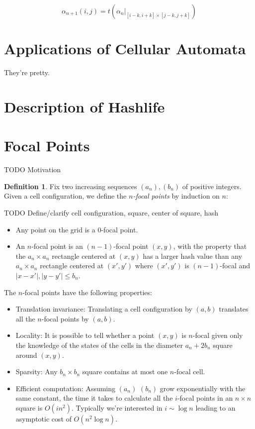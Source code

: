 \documentclass{article}
\theoremstyle{definition}
\newtheorem{definition}{Definition}
\begin{document}
$$ \alpha _{n+1} (i, j) = t (\alpha_n |_{[i-k, i+k] \times [j-k, j+k]}) $$

\section{Applications of Cellular Automata}

They're pretty.

\section{Description of Hashlife}

\section{Focal Points}

TODO Motivation

\begin{definition}
Fix two increasing sequences $(a_n), (b_n)$ of positive integers. Given a cell
configuration, we define the \emph{$n$-focal points} by induction on $n$:

TODO Define/clarify cell configuration, square, center of square, hash

\begin{itemize}
\item Any point on the grid is a $0$-focal point.
\item An $n$-focal point is an $(n-1)$-focal point $(x, y)$, with the property
that the $a_n \times a_n$ rectangle centered at $(x, y)$ has a larger hash value
than any $a_n \times a_n$ rectangle centered at $(x', y')$ where $(x', y')$ is
$(n-1)$-focal and $|x - x'|, |y - y'| \leq b_n$.
\end{itemize}
\end{definition}

The $n$-focal points have the following properties:

\begin{itemize}
\item Translation invariance: Translating a cell configuration by $(a, b)$
translates all the $n$-focal points by $(a, b)$.

\item Locality: It is possible to tell whether a point $(x, y)$ is $n$-focal
given only the knowledge of the states of the cells in the diameter $a_n + 2
b_n$ square around $(x, y)$.

\item Sparsity: Any $b_n \times b_n$ square contains at most one $n$-focal cell.

\item Efficient computation: Assuming $(a_n)$ $(b_n)$ grow exponentially with
the same constant, the time it takes to calculate all the $i$-focal points in an
$n \times n$ square is $O (i n^2)$. Typically we're interested in $i \sim \log
n$ leading to an asymptotic cost of $O (n^2 \log n)$.
\end{itemize}
\end{document}
